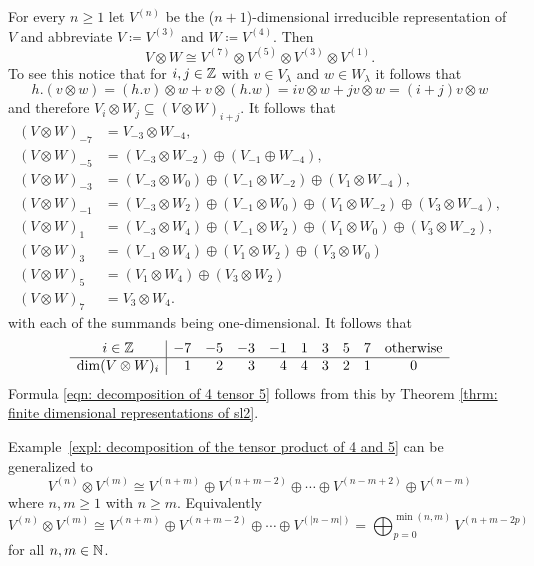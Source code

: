\begin{expl}\label{expl: decomposition of the tensor product of 4 and 5}
 For every $n \geq 1$ let $V^{(n)}$ be the ($n+1$)-dimensional irreducible representation of $V$ and abbreviate $V \coloneqq V^{(3)}$ and $W \coloneqq V^{(4)}$. Then
 \begin{equation}\label{eqn: decomposition of 4 tensor 5}
  V \otimes W \cong V^{(7)} \otimes V^{(5)} \otimes V^{(3)} \otimes V^{(1)}.
 \end{equation}
 To see this notice that for $i,j \in \mathbb{Z}$ with $v \in V_\lambda$ and $w \in W_\lambda$ it follows that
 \[
  h.(v \otimes w)
  = (h.v) \otimes w + v \otimes (h.w)
  = iv \otimes w + jv \otimes w
  = (i+j) v \otimes w
 \]
 and therefore $V_i \otimes W_j \subseteq (V \otimes W)_{i+j}$. It follows that
 \begin{align*}
  (V \otimes W)_{-7}
  &= V_{-3} \otimes W_{-4}, \\
  (V \otimes W)_{-5}
  &= (V_{-3} \otimes W_{-2}) \oplus (V_{-1} \oplus W_{-4}), \\
  (V \otimes W)_{-3}
  &= (V_{-3} \otimes W_0) \oplus (V_{-1} \otimes W_{-2}) \oplus (V_1 \otimes W_{-4}), \\
  (V \otimes W)_{-1}
  &= (V_{-3} \otimes W_2) \oplus (V_{-1} \otimes W_0) \oplus (V_1 \otimes W_{-2}) \oplus (V_3 \otimes W_{-4}), \\
  (V \otimes W)_1
  &= (V_{-3} \otimes W_4) \oplus (V_{-1} \otimes W_2) \oplus (V_1 \otimes W_0) \oplus (V_3 \otimes W_{-2}), \\
  (V \otimes W)_3
  &= (V_{-1} \otimes W_4) \oplus (V_1 \otimes W_2) \oplus (V_3 \otimes W_0) \\
  (V \otimes W)_5
  &= (V_1 \otimes W_4) \oplus (V_3 \otimes W_2) \\
  (V \otimes W)_7
  &= V_3 \otimes W_4.
 \end{align*}
 with each of the summands being one-dimensional. It follows that
 \[
  \begin{array}{c|rrrrrrrrc}
   i \in \mathbb{Z}             & -7 & -5 & -3 & -1 & 1 & 3 & 5 & 7 & \text{otherwise} \\
   \hline
   \dim (V \otimes W)_i &  1 &  2 &  3 &  4 & 4 & 3 & 2 & 1 & 0
  \end{array}
 \]
 Formula \eqref{eqn: decomposition of 4 tensor 5} follows from this by Theorem \ref{thrm: finite dimensional representations of sl2}.
\end{expl}


\begin{rem}
 Example~\ref{expl: decomposition of the tensor product of 4 and 5} can be generalized to
 \[
  V^{(n)} \otimes V^{(m)}
  \cong V^{(n+m)} \oplus V^{(n+m-2)} \oplus \dotsb \oplus V^{(n-m+2)} \oplus V^{(n-m)}
 \]
 where $n, m \geq 1$ with $n \geq m$. Equivalently
 \[
  V^{(n)} \otimes V^{(m)}
  \cong V^{(n+m)} \oplus V^{(n+m-2)} \oplus \dotsb \oplus V^{(|n-m|)}
  = \bigoplus_{p = 0}^{\min(n,m)} V^{(n+m-2p)}
 \]
 for all $n,m \in \mathbb{N}$.
\end{rem}


















